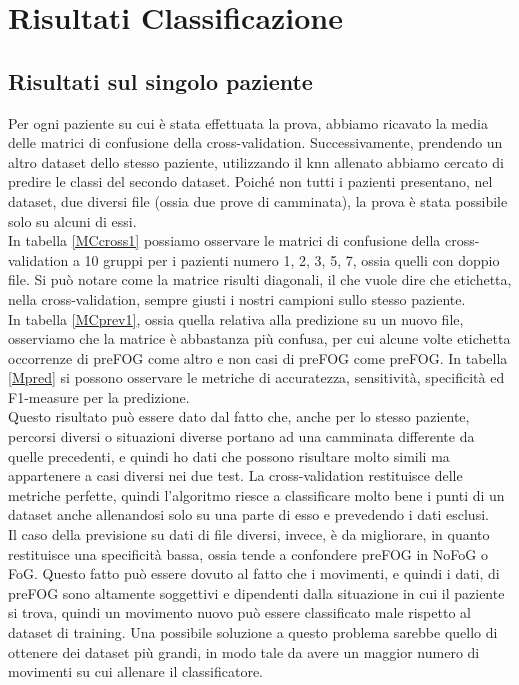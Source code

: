 \section{Risultati Classificazione}
\subsection{Risultati sul singolo paziente}
Per ogni paziente su cui è stata effettuata la prova, abbiamo ricavato la media delle matrici di confusione della cross-validation. Successivamente, prendendo un altro dataset dello stesso paziente, utilizzando il knn allenato abbiamo cercato di predire le classi del secondo dataset. Poiché non tutti i pazienti presentano, nel dataset, due diversi file (ossia due prove di camminata), la prova è stata possibile solo su alcuni di essi.\\
In tabella \ref{MCcross1} possiamo osservare le matrici di confusione della cross-validation a 10 gruppi per i pazienti numero 1, 2, 3, 5, 7, ossia quelli con doppio file. Si può notare come la matrice risulti diagonali, il che vuole dire che etichetta, nella cross-validation, sempre giusti i nostri campioni sullo stesso paziente.\\
In tabella \ref{MCprev1}, ossia quella relativa alla predizione su un nuovo file, osserviamo che la matrice è abbastanza più confusa, per cui alcune volte etichetta occorrenze di preFOG come altro e non casi di preFOG come preFOG. In tabella \ref{Mpred} si possono osservare le metriche di accuratezza, sensitività, specificità ed F1-measure per la predizione.\\
Questo risultato può essere dato dal fatto che, anche per lo stesso paziente, percorsi diversi o situazioni diverse portano ad una camminata differente da quelle precedenti, e quindi ho dati che possono risultare molto simili ma appartenere a casi diversi nei due test. La cross-validation restituisce delle metriche perfette, quindi l'algoritmo riesce a classificare molto bene i punti di un dataset anche allenandosi solo su una parte di esso e prevedendo i dati esclusi.\\
Il caso della previsione su dati di file diversi, invece, è  da migliorare, in quanto restituisce una specificità bassa, ossia tende a confondere preFOG in NoFoG o FoG. Questo fatto può essere dovuto al fatto che i movimenti, e quindi i dati, di preFOG sono altamente soggettivi e dipendenti dalla situazione in cui il paziente si trova, quindi un movimento nuovo può essere classificato male rispetto al dataset di training. Una possibile soluzione a questo problema sarebbe quello di ottenere dei dataset più grandi, in modo tale da avere un maggior numero di movimenti su cui allenare il classificatore.
